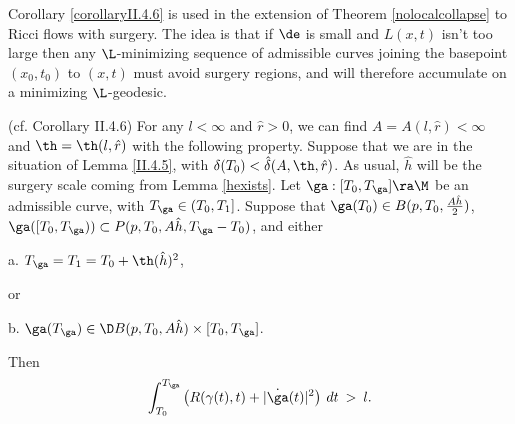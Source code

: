 Corollary \ref{corollaryII.4.6} is used in the extension of
Theorem \ref{nolocalcollapse} to Ricci flows with
surgery.   The idea is that if $\de$ is small
and $L(x,t)$ isn't too large then any $\L$-minimizing sequence of
admissible curves joining the basepoint $(x_0,t_0)$ to $(x,t)$
must avoid surgery regions, and will therefore
accumulate on a minimizing $\L$-geodesic.

\begin{corollary}
  \label{cor:kl-curves-that-penetrate-surgery-region-ricci-flow-surgery-corollary}
 (cf. Corollary II.4.6)
\label{corollaryII.4.6}
For any $l<\infty$ and $\hat r>0$, we can find $A=A(l,\hat r)<\infty$ and
$\th=\th(l,\hat r)$ with the following property.
Suppose that we are in the situation of Lemma \ref{II.4.5}, with
$\delta(T_0) < \hat{\delta}(A, \th, \hat r)$.
As usual,
$\hat h$ will be the surgery scale coming from Lemma \ref{hexists}.
Let $\ga:[T_0,T_\ga]\ra \M$
be an admissible curve, with
$T_\ga\in (T_0,T_1]$.
Suppose that
$\ga(T_0)\in B(p,T_0,\frac{A\hat h}{2})$,
$\ga([T_0,T_\ga))\subset P(p,T_0,A\hat h, T_\ga-T_0)$, and
either

a. $T_\ga=T_1=T_0+\th(\hat h)^2$,

or

b. $\ga(T_\ga)\in\D B(p,T_0,A\hat h)\times [T_0,T_\ga]$.

Then
\begin{equation}
\int_{T_0}^{T_\ga} \left( R(\gamma(t),t)+|\dot{\ga}(t)|^2 \right) \: dt
\: > \: l.
\end{equation}
\end{corollary}
